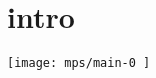 \documentclass[11pt]{article}
\begin{document}
\section*{intro}
      \texttt{[image:  mps/main-0 ]}
\end{document}

